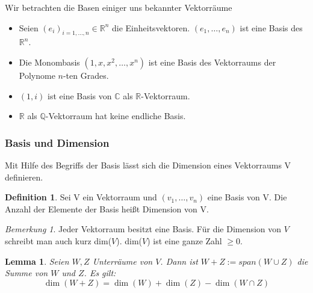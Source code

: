 \documentclass[fontsize=12pt,paper=a4,twoside,bibtotoc,idxtotoc,
liststotoc,pagesize,BCOR1.2cm,DIV15,chapterprefix,pagesize=pdftex]{scrbook}
\theoremstyle{plain}
\newtheorem{lm}[equation]{Lemma}
\theoremstyle{definition}
\newtheorem{df}[equation]{Definition}
\theoremstyle{remark}
\newtheorem{bem}[equation]{Bemerkung}
\begin{document}
Wir betrachten die Basen einiger uns bekannter Vektorräume
\begin{itemize}
\item Seien $(e_i)_{i=1,\ldots,n} \in \mathbb{R}^n$ die Einheitsvektoren. $(e_1, \dots
,e_n)$ ist eine Basis des $\mathbb{R}^n$.
\item Die Monombasis $(1,x,x^2,\dots, x^n)$ ist eine Basis des
Vektorraums der Polynome $n$-ten Grades.
\item $(1,i)$ ist eine Basis von $\mathbb{C}$ als
$\mathbb{R}$-Vektorraum. 
\item $\mathbb{R}$ als $\mathbb{Q}$-Vektorraum hat keine endliche
Basis. 
\end{itemize}
\subsubsection{Basis und Dimension}
Mit Hilfe des Begriffs der Basis lässt sich die Dimension eines Vektorraums V definieren.
\begin{df}
 Sei V ein Vektorraum und $(v_1,\dots, v_n)$ eine Basis von V. Die Anzahl der Elemente der Basis heißt Dimension von V.
\end{df}
\begin{bem}
 Jeder Vektorraum besitzt eine Basis. Für die Dimension von $V$ schreibt man auch kurz dim($V$). dim($V$) ist eine ganze Zahl $\geq0$.
\end{bem}
\begin{lm}
 Seien $W,Z$ Unterräume von $V$. Dann ist $W+Z:=span(W \cup Z)$
die Summe von $W$ und $Z$. Es gilt:
\[ \dim(W+Z)=\dim(W) + \dim (Z) - \dim( W \cap Z) \]

\end{lm}
\end{document}
